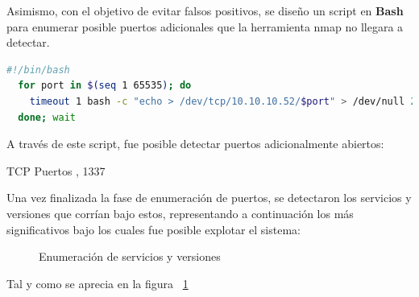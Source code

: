\documentclass[a4paper]{article}
\begin{document}
  Asimismo, con el objetivo de evitar falsos positivos, se diseño un script en \textbf{Bash} para enumerar posible puertos adicionales que la herramienta nmap no llegara a detectar.\par
  \begin{lstlisting}[language=Bash, caption=Script personalizado para enumerar puertos]
  #!/bin/bash
  for port in $(seq 1 65535); do
    timeout 1 bash -c "echo > /dev/tcp/10.10.10.52/$port" > /dev/null 2>&1 && echo "$port/tcp" &
  done; wait
  \end{lstlisting}
  A través de este script, fue posible detectar puertos adicionalmente abiertos:
  \begin{schema}{TCP}
    Puertos
    , 1337
  \end{schema}
  Una vez finalizada la fase de enumeración de puertos, se detectaron los servicios y versiones que corrían bajo estos, representando a continuación los más significativos bajo los cuales fue posible explotar el sistema:\par
  \begin{figure}[h]
    \centering
    \caption{Enumeración de servicios y versiones}
    \label{fig:servicesResults}
  \end{figure}
  Tal y como se aprecia en la figura ~\ref{fig:servicesResults}
\end{document}
